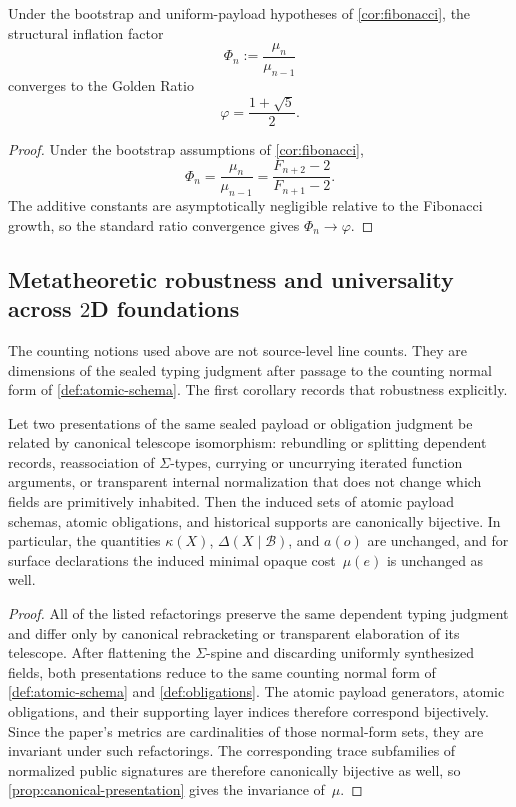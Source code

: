 \documentclass{lmcs}
\newcommand{\B}{\mathcal{B}}
\begin{document}
\begin{cor}
\label{cor:phi}
Under the bootstrap and uniform-payload hypotheses of \autoref{cor:fibonacci}, the structural inflation factor
\[
  \Phi_n := \frac{\mu_n}{\mu_{n-1}}
\]
converges to the Golden Ratio
\[
  \varphi = \frac{1+\sqrt{5}}{2}.
\]
\end{cor}

\begin{proof}
Under the bootstrap assumptions of \autoref{cor:fibonacci},
\[
  \Phi_n
  =
  \frac{\mu_n}{\mu_{n-1}}
  =
  \frac{F_{n+2}-2}{F_{n+1}-2}.
\]
The additive constants are asymptotically negligible relative to the Fibonacci growth, so the standard ratio convergence gives $\Phi_n \to \varphi$.
\end{proof}

\subsection{\texorpdfstring{Metatheoretic robustness and universality across $2$D foundations}{Metatheoretic robustness and universality across 2D foundations}}

The counting notions used above are not source-level line counts. They are dimensions of the sealed typing judgment after passage to the counting normal form of \autoref{def:atomic-schema}. The first corollary records that robustness explicitly.

\begin{cor}
\label{cor:refactoring}
Let two presentations of the same sealed payload or obligation judgment be related by canonical telescope isomorphism: rebundling or splitting dependent records, reassociation of $\Sigma$-types, currying or uncurrying iterated function arguments, or transparent internal normalization that does not change which fields are primitively inhabited. Then the induced sets of atomic payload schemas, atomic obligations, and historical supports are canonically bijective. In particular, the quantities $\kappa(X)$, $\Delta(X \mid \B)$, and $a(o)$ are unchanged, and for surface declarations the induced minimal opaque cost~$\mu(e)$ is unchanged as well.
\end{cor}

\begin{proof}
All of the listed refactorings preserve the same dependent typing judgment and differ only by canonical rebracketing or transparent elaboration of its telescope. After flattening the $\Sigma$-spine and discarding uniformly synthesized fields, both presentations reduce to the same counting normal form of \autoref{def:atomic-schema} and \autoref{def:obligations}. The atomic payload generators, atomic obligations, and their supporting layer indices therefore correspond bijectively. Since the paper's metrics are cardinalities of those normal-form sets, they are invariant under such refactorings. The corresponding trace subfamilies of normalized public signatures are therefore canonically bijective as well, so \autoref{prop:canonical-presentation} gives the invariance of~$\mu$.
\end{proof}
\end{document}
